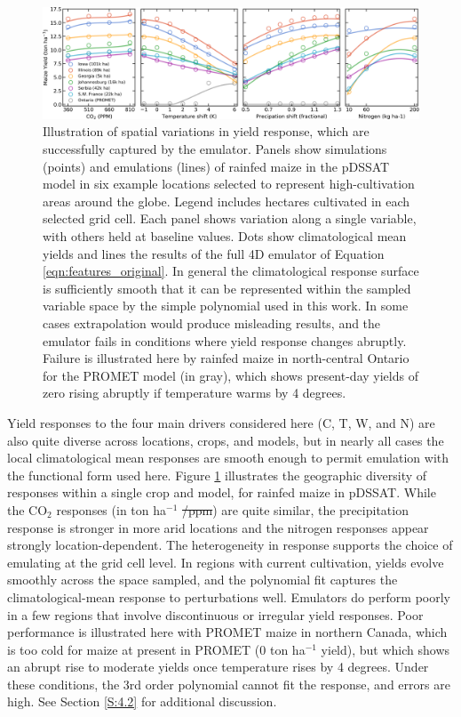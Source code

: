 \documentclass[gmdd]{copernicus} %
\providecommand{\DIFadd}[1]{{\protect\color{blue}\uwave{#1}}} %
\providecommand{\DIFdel}[1]{{\protect\color{red}\sout{#1}}}                      %
\providecommand{\DIFaddbegin}{} %
\providecommand{\DIFaddend}{} %
\providecommand{\DIFdelbegin}{} %
\providecommand{\DIFdelend}{} %
\begin{document}
\begin{figure}[ht]
\centering
    \includegraphics[width=16.3cm]{figures/regression_example.png}
    \caption{
    Illustration of spatial variations in yield response, which are successfully captured by the emulator. 
    Panels show simulations (points) and emulations (lines) of rainfed maize in the pDSSAT model in six example locations selected to represent high-cultivation areas around the globe. 
    Legend includes hectares cultivated in each selected grid cell. 
    Each panel shows variation along a single variable, with others held at baseline values. 
    Dots show climatological mean yields and lines the results of the full 4D emulator of Equation \ref{eqn:features_original}. 
    In general the climatological response surface is sufficiently smooth that it can be represented within the sampled variable space by the simple polynomial used in this work. 
    In some cases extrapolation would produce misleading results, and the emulator fails in conditions where yield response changes abruptly. 
    Failure is illustrated here by rainfed maize in north-central Ontario for the PROMET model (in gray), which shows present-day yields of zero rising abruptly if temperature warms by 4 degrees.
    }
   \label{fig:regression}
\end{figure}

Yield responses to the four main drivers considered here (C, T, W, and N) are also quite diverse across locations, crops, and models, but in nearly all cases the local climatological mean responses are smooth enough to permit emulation with the functional form used here.
Figure \ref{fig:regression} illustrates the geographic diversity of responses within a single crop and model, for rainfed maize in pDSSAT. 
While the CO$_2$ responses (in ton ha$^{-1}$ \DIFdelbegin \DIFdel{/ppm}\DIFdelend \DIFaddbegin \DIFadd{ppm$^{-1}$}\DIFaddend ) are quite similar, the  precipitation response is stronger in more arid locations and the nitrogen responses appear strongly location-dependent. 
The heterogeneity in response supports the choice of emulating at the grid cell level. 
In regions with current cultivation, yields evolve smoothly across the space sampled, and the polynomial fit captures the climatological-mean response to perturbations well. 
Emulators do perform poorly in a few regions that involve discontinuous or irregular yield responses. 
Poor performance is illustrated here with PROMET maize in northern Canada, which is too cold for maize at present in PROMET (0 ton ha$^{-1}$ yield), but which shows an abrupt rise to moderate yields once temperature rises by 4 degrees.
Under these conditions, the 3rd order polynomial cannot fit the response, and errors are high. See Section \ref{S:4.2} for additional discussion. 
\end{document}
